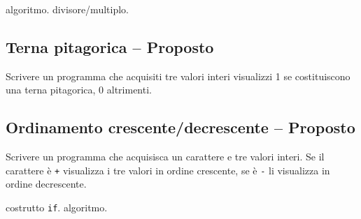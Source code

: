 \begin{tags}
algoritmo. divisore/multiplo.
\end{tags}


\prosep{}

\subsection{Terna pitagorica -- Proposto}
Scrivere un programma che acquisiti tre valori interi visualizzi 1 se costituiscono una terna pitagorica, 0 altrimenti.

\subsection{Ordinamento crescente/decrescente -- Proposto}
Scrivere un programma che acquisisca un carattere e tre valori interi. Se il carattere \`e \texttt{+} visualizza i tre valori in ordine crescente, se \`e \texttt{-} li visualizza in ordine decrescente.

\begin{tags}
costrutto \texttt{if}. algoritmo.
\end{tags}


